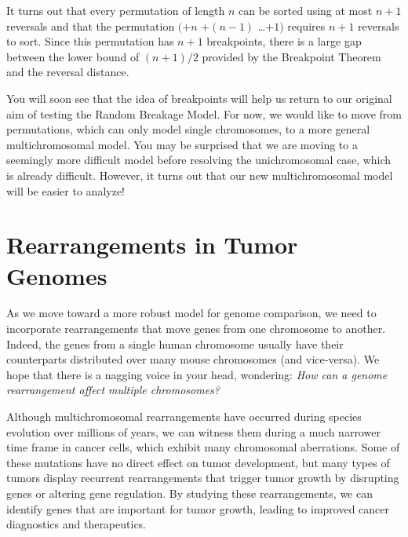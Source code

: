 \begin{exercise}\end{exercise}

\vspace{-1ex}

\noindent It turns out that every permutation of length $n$ can be sorted using at most $n+1$ reversals and that the permutation $(+n$ $+(n-1)$ \ldots $+1)$ requires $n+1$ reversals to sort. Since this permutation has $n+1$ breakpoints, there is a large gap between the lower bound of $(n+1)/2$ provided by the Breakpoint Theorem and the reversal distance.

You will soon see that the idea of breakpoints will help us return to our original aim of testing the Random Breakage Model.   For now, we would like to move from permutations, which can only model single chromosomes, to a more general multichromosomal model.  You may be surprised that we are moving to a seemingly more difficult model before resolving the unichromosomal case, which is already difficult. However, it turns out that our new multichromosomal model will be easier to analyze!\\

\FloatBarrier
\section{Rearrangements in Tumor Genomes}
\label{sec:rearrangements_in_tumor_genomes}

As we move toward a more robust model for genome comparison, we need to incorporate rearrangements that move genes from one chromosome to another. Indeed, the genes from a single human chromosome usually have their counterparts distributed over many mouse chromosomes (and vice-versa).  We hope that there is a nagging voice in your head, wondering: \textit{How can a genome rearrangement affect multiple chromosomes?}

Although multichromosomal rearrangements have occurred during species evolution over millions of years, we can witness them during a much narrower time frame in cancer cells, which exhibit many chromosomal aberrations. Some of these mutations have no direct effect on tumor development, but many types of tumors display recurrent rearrangements that trigger tumor growth by disrupting genes or altering gene regulation. By studying these rearrangements, we can identify genes that are important for tumor growth, leading to improved cancer diagnostics and therapeutics.


